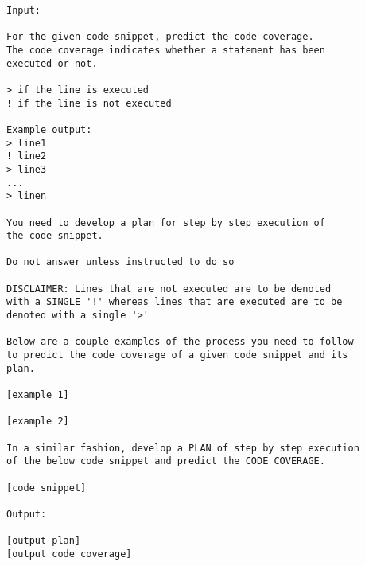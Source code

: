 \documentclass[sigconf]{acmart}
\begin{document}
\begin{verbatim}
Input:

For the given code snippet, predict the code coverage.
The code coverage indicates whether a statement has been
executed or not.

> if the line is executed
! if the line is not executed

Example output:
> line1
! line2
> line3
...
> linen

You need to develop a plan for step by step execution of
the code snippet.

Do not answer unless instructed to do so

DISCLAIMER: Lines that are not executed are to be denoted
with a SINGLE '!' whereas lines that are executed are to be
denoted with a single '>'

Below are a couple examples of the process you need to follow
to predict the code coverage of a given code snippet and its
plan.

[example 1]

[example 2]

In a similar fashion, develop a PLAN of step by step execution
of the below code snippet and predict the CODE COVERAGE.

[code snippet]

Output:

[output plan]
[output code coverage]
\end{verbatim}
\end{document}
